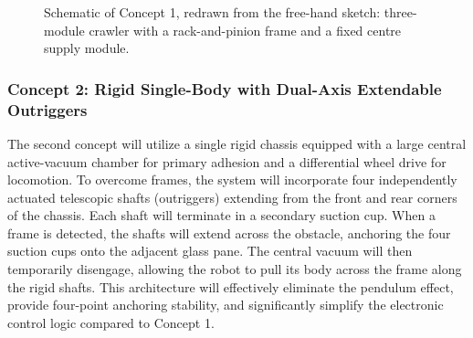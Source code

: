 \documentclass[12pt, a4paper]{article}
\newcommand{\cleanerglass}[2]{%
  \fill[pattern=north east lines, pattern color=gray!60] (#1,-9) rectangle (#2,0);
  \draw[thick] (#1,0) -- (#2,0);}
\newcommand{\cleanerframe}[2]{%
  \begin{scope}[shift={(#1,0)}]
    \draw[fill=gray!10] (-#2,150) rectangle (#2,188);
    \draw[fill=gray!35] (-#2+10,150) rectangle (#2-10,162);
    \draw[fill=white]   (-#2+10,172) rectangle (#2-10,180);
  \end{scope}}
\newcommand{\cleanermodule}[3]{%
  \begin{scope}[shift={(#1,0)}]
    \begin{scope}[shift={(0,#2)}]
      \draw[fill=gray!60] (-56,0) rectangle (-44,30) (44,0) rectangle (56,30);
      \draw[pattern=north east lines] (-40,0) rectangle (40,4);
      \draw[fill=gray!30] (-60,4) rectangle (60,10);
      \draw[fill=gray!12] (-40,10) rectangle (40,72);
      \draw[densely dashed] (-30,10) .. controls (-24,36) and (-7,32) .. (-6,50) -- (-6,72)
                            (30,10) .. controls (24,36) and (7,32) .. (6,50) -- (6,72);
      \draw[fill=gray!45] (-16,72) -- (-11,86) -- (11,86) -- (16,72) -- cycle;
      \draw[fill=gray!70] (-38,72) rectangle (-30,98) (30,72) rectangle (38,98);
    \end{scope}
    \draw[line width=0.9pt] (-34,98+#2) -- (-34,140) (34,98+#2) -- (34,140);
    \draw[fill=gray!30] (-45,140) rectangle (45,146);
    \draw[fill=white] (-9,146) rectangle (9,172);
    \ifnum#3=0
      \draw[fill=black!75] (-60,164) rectangle (60,172);
      \draw[densely dashed, fill=blue!15, fill opacity=0.45] (-75,104) rectangle (75,160);
    \else
      \draw[fill=gray!50] (-46,150) rectangle (46,162);
      \draw[fill=gray!70] (#3*46,150) rectangle (#3*72,162);
      \draw[fill=gray!25] (#3*-30,164) rectangle (#3*72,172);
      \draw[fill=gray!70] (#3*50,172) rectangle (#3*68,200);
    \fi
  \end{scope}}
\begin{document}
\begin{figure}[H]
    \par{}\par\bigskip

    \par{}
    \caption{Schematic of Concept 1, redrawn from the free-hand sketch: three-module crawler with a rack-and-pinion frame and a fixed centre supply module.}
    \label{fig:concept1}
\end{figure}

\subsubsection{Concept 2: Rigid Single-Body with Dual-Axis Extendable Outriggers}
The second concept will utilize a single rigid chassis equipped with a large central active-vacuum chamber for primary adhesion and a differential wheel drive for locomotion. To overcome frames, the system will incorporate four independently actuated telescopic shafts (outriggers) extending from the front and rear corners of the chassis. Each shaft will terminate in a secondary suction cup. When a frame is detected, the shafts will extend across the obstacle, anchoring the four suction cups onto the adjacent glass pane. The central vacuum will then temporarily disengage, allowing the robot to pull its body across the frame along the rigid shafts. This architecture will effectively eliminate the pendulum effect, provide four-point anchoring stability, and significantly simplify the electronic control logic compared to Concept 1.
\end{document}
